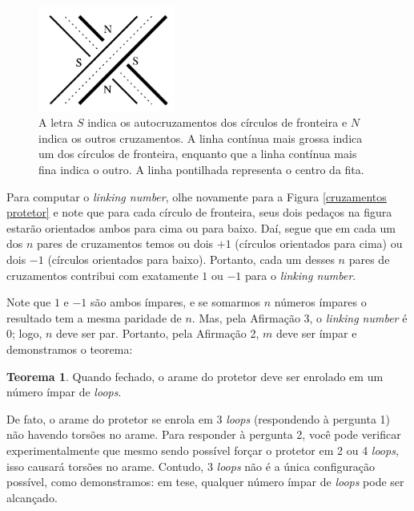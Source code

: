 \documentclass[a4paper,portuguese,11pt,twoside, leqno]{book}
\theoremstyle{definition}
\newtheorem{theorem}{Teorema}[section]
\begin{document}
	\begin{figure}[H]
		\begin{center}
			\includegraphics[width=4.5cm]{Images/protetor_fechado.png}
		\end{center}\caption{A letra $S$ indica os autocruzamentos dos círculos de fronteira e $N$ indica os outros cruzamentos. A linha contínua mais grossa indica um dos círculos de fronteira, enquanto que a linha contínua mais fina indica o outro. A linha pontilhada representa o centro da fita.}\label{cruzamentos protetor}
	\end{figure}
	\par\vspace{0.3cm} Para computar o \textit{linking number}, olhe novamente para a Figura \eqref{cruzamentos protetor} e note que para cada círculo de fronteira, seus dois pedaços na figura estarão orientados ambos para cima ou para baixo. Daí, segue que em cada um dos $n$ pares de cruzamentos temos ou dois $+1$ (círculos orientados para cima) ou dois $-1$ (círculos orientados para baixo). Portanto, cada um desses $n$ pares de cruzamentos contribui com exatamente $1$ ou $-1$ para o \textit{linking number}.
	\par\vspace{0.3cm} Note que $1$ e $-1$ são ambos ímpares, e se somarmos $n$ números ímpares o resultado tem a mesma paridade de $n$. Mas, pela Afirmação 3, o \textit{linking number} é $0$; logo, $n$ deve ser par. Portanto, pela Afirmação 2, $m$ deve ser ímpar e demonstramos o teorema:
	\begin{theorem}
		\label{teorema protetor de para-brisa}
		Quando fechado, o arame do protetor deve ser enrolado em um número ímpar de \textit{loops}.
	\end{theorem}  
	\par\vspace{0.3cm} De fato, o arame do protetor se enrola em 3 \textit{loops} (respondendo à pergunta 1) não havendo torsões no arame. Para responder à pergunta 2, você pode verificar experimentalmente que mesmo sendo possível forçar o protetor em 2 ou 4 \textit{loops}, isso causará torsões no arame. Contudo, $3$ \textit{loops} não é a única configuração possível, como demonstramos: em tese, qualquer número ímpar de \textit{loops} pode ser alcançado.
	
\end{document}
